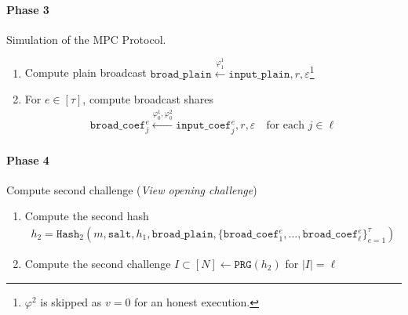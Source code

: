 \documentclass[11pt]{report}
\theoremstyle{definition}
\theoremstyle{plain}
\begin{document}
\begin{protocol}
  \paragraph{Phase 3} Simulation of the MPC Protocol.
  \begin{enumerate}[itemsep=0pt, topsep=0pt, parsep=0pt]
    \item Compute plain broadcast $\texttt{broad\_plain} \stackrel{\varphi^1_1}{\longleftarrow} \texttt{input\_plain}, r, \varepsilon$\footnote{$\varphi^2$ is skipped as $v = 0$ for an honest execution.}
    \item For $e \in [\tau]$, compute broadcast shares
          \begin{align*}
            \texttt{broad\_coef}_j^e \stackrel{\varphi^1_0, \varphi^2_0}{\longleftarrow} \texttt{input\_coef}_j^e, r, \varepsilon \quad \text{for each } j \in \ell
          \end{align*}
  \end{enumerate}

  \paragraph{Phase 4} Compute second challenge (\textit{View opening challenge})
  \begin{enumerate}[itemsep=0pt, topsep=0pt, parsep=0pt]
    \item Compute the second hash
          \begin{align*}
            h_2 = \texttt{Hash}_2(m, \texttt{salt}, h_1, \texttt{broad\_plain}, \{\texttt{broad\_coef}^e_1, \dots, \texttt{broad\_coef}^e_\ell\}_{e=1}^\tau)
          \end{align*}
    \item Compute the second challenge $I \subset [N] \leftarrow \texttt{PRG}(h_2)$ for $|I| = \ell$
  \end{enumerate}


\end{protocol}
\end{document}

